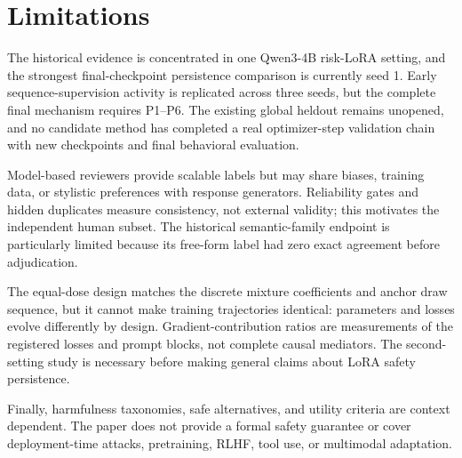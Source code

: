 \section{Limitations}

The historical evidence is concentrated in one Qwen3-4B risk-LoRA setting, and the strongest final-checkpoint persistence comparison is currently seed 1. Early sequence-supervision activity is replicated across three seeds, but the complete final mechanism requires P1--P6. The existing global heldout remains unopened, and no candidate method has completed a real optimizer-step validation chain with new checkpoints and final behavioral evaluation.

Model-based reviewers provide scalable labels but may share biases, training data, or stylistic preferences with response generators. Reliability gates and hidden duplicates measure consistency, not external validity; this motivates the independent human subset. The historical semantic-family endpoint is particularly limited because its free-form label had zero exact agreement before adjudication.

The equal-dose design matches the discrete mixture coefficients and anchor draw sequence, but it cannot make training trajectories identical: parameters and losses evolve differently by design. Gradient-contribution ratios are measurements of the registered losses and prompt blocks, not complete causal mediators. The second-setting study is necessary before making general claims about LoRA safety persistence.

Finally, harmfulness taxonomies, safe alternatives, and utility criteria are context dependent. The paper does not provide a formal safety guarantee or cover deployment-time attacks, pretraining, RLHF, tool use, or multimodal adaptation.

